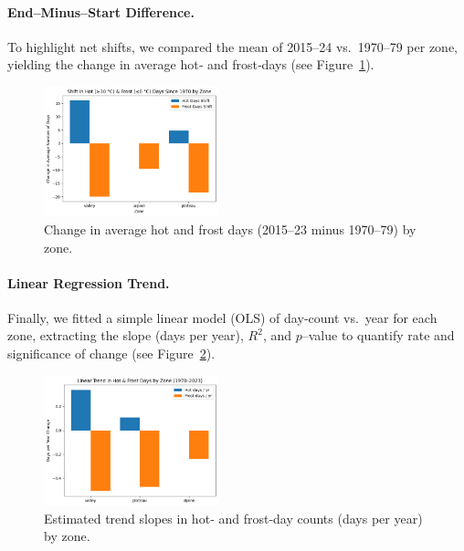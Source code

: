 \paragraph{End–Minus–Start Difference.}
To highlight net shifts, we compared the mean of 2015–24 vs.\ 1970–79 per zone, yielding the change in average hot‐ and frost‐days (see Figure~\ref{fig:decade_difference}).
\begin{figure}[ht]
  \centering
    \includegraphics[width=0.45\textwidth]{img/end-minus-start_diff.png}
  \caption{Change in average hot and frost days (2015–23 minus 1970–79) by zone.}
  \label{fig:decade_difference}
\end{figure}

\paragraph{Linear Regression Trend.}
Finally, we fitted a simple linear model (OLS) of day‐count vs.\ year for each zone, extracting the slope (days per year), $R^2$, and $p$–value to quantify rate and significance of change (see Figure~\ref{fig:linear_trend}).
\begin{figure}[ht]
  \centering
    \includegraphics[width=0.45\textwidth]{img/linear_reg_trend.png}
  \caption{Estimated trend slopes in hot‐ and frost‐day counts (days per year) by zone.}
  \label{fig:linear_trend}
\end{figure}



